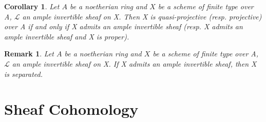 \documentclass{ctexart}
\newtheorem{remark}{Remark}[section]
\newtheorem{corollary}{Corollary}[section]
\begin{document}
\begin{corollary}
    Let $A$ be a noetherian ring and $X$ be a scheme of finite type over A, $\mathcal{L}$ an ample invertible sheaf on X.
    Then X is quasi-projective (resp. projective) over A if and only if X admits an ample invertible sheaf (resp. X admits an ample invertible sheaf and X is proper).
    \label{Corollary 6.2}
\end{corollary}
\begin{remark}
    Let $A$ be a noetherian ring and $X$ be a scheme of finite type over A, $\mathcal{L}$ an ample invertible sheaf on X.
    If X admits an ample invertible sheaf, then X is separated.
\end{remark}

\section{Sheaf Cohomology}
\label{section:Sheaf Cohomology}
\end{document}
